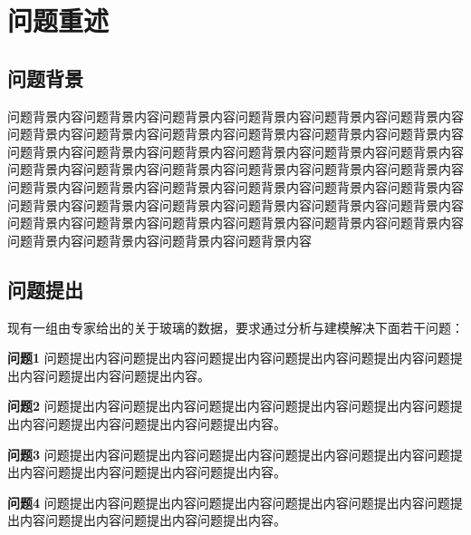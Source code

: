 \section{问题重述}

\subsection{问题背景}

问题背景内容问题背景内容问题背景内容问题背景内容问题背景内容问题背景内容问题背景内容问题背景内容问题背景内容问题背景内容问题背景内容问题背景内容问题背景内容问题背景内容问题背景内容问题背景内容问题背景内容问题背景内容问题背景内容问题背景内容问题背景内容问题背景内容问题背景内容问题背景内容问题背景内容问题背景内容问题背景内容问题背景内容问题背景内容问题背景内容问题背景内容问题背景内容问题背景内容问题背景内容问题背景内容问题背景内容问题背景内容问题背景内容问题背景内容问题背景内容问题背景内容问题背景内容问题背景内容问题背景内容问题背景内容问题背景内容

\subsection{问题提出}

现有一组由专家给出的关于玻璃的数据，要求通过分析与建模解决下面若干问题：

\textbf{问题1} 问题提出内容问题提出内容问题提出内容问题提出内容问题提出内容问题提出内容问题提出内容问题提出内容。

\textbf{问题2} 问题提出内容问题提出内容问题提出内容问题提出内容问题提出内容问题提出内容问题提出内容问题提出内容问题提出内容。

\textbf{问题3} 问题提出内容问题提出内容问题提出内容问题提出内容问题提出内容问题提出内容问题提出内容问题提出内容问题提出内容。

\textbf{问题4} 问题提出内容问题提出内容问题提出内容问题提出内容问题提出内容问题提出内容问题提出内容问题提出内容问题提出内容。